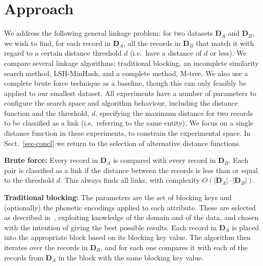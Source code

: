 \documentclass{llncs}
\begin{document}
\section{Approach}
\label{sec-approach}

We address the following general linkage problem: for two datasets
$\mathbf{D}_A$ and $\mathbf{D}_B$, we wish to find, for each record in
$\mathbf{D}_A$, all the records in $\mathbf{D}_B$ that match it with
regard to a certain distance threshold $d$ (i.e.\ have a distance of $d$
or less). We compare several linkage algorithms: traditional blocking,
an incomplete similarity search method, LSH-MinHash, and a complete
method, M-tree. We also use a complete brute force technique as a
baseline, though this can only feasibly be applied to our smallest
dataset. All experiments have a number of parameters to configure the
search space and algorithm behaviour, including the distance function
and the threshold, $d$, specifying the maximum distance for two records
to be classified as a link (i.e.\ referring to the same entity). We
focus on a single distance function in these experiments, to constrain
the experimental space. In Sect.~\ref{sec-concl} we return to the
selection of alternative distance functions.

\textbf{Brute force:} Every record in $\mathbf{D}_A$ is compared with
every record in $\mathbf{D}_B$. Each pair is classified as a link if
the distance between the records is less than or equal to the
threshold $d$. This always finds all links, with complexity
$ O(|\mathbf{D}_A| \cdot |\mathbf{D}_B|)$.

\textbf{Traditional blocking:} The parameters are the set of blocking
keys and (optionally) the phonetic encodings applied to each attribute.
These are selected as described in~\cite{Chr12b}, exploiting knowledge
of the domain and of the data, and chosen with the intention of giving
the best possible results. Each record in $\mathbf{D}_A$ is placed into
the appropriate block based on its blocking key value. The algorithm
then iterates over the records in $\mathbf{D}_B$, and for each one
compares it with each of the records from $\mathbf{D}_A$ in the block
with the same blocking key value.
\end{document}
